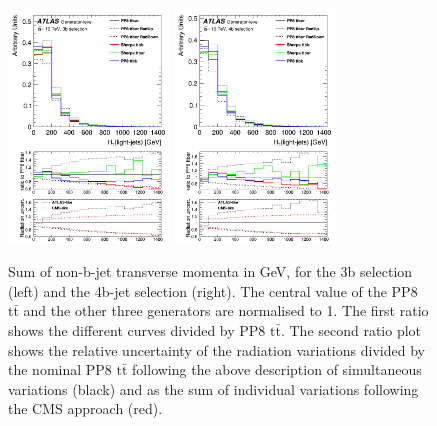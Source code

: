 \begin{figure}[!htb]
\centering
\includegraphics[width=0.38\textwidth]{Plots/ttbb/hisgenHTljets_4j3t__div}
\includegraphics[width=0.38\textwidth]{Plots/ttbb/hisgenHTljets_4j4t__div}
  \caption{Sum of non-b-jet transverse momenta in GeV, for the 3b selection (left) and the 4b-jet selection (right). The central value of the PP8 $\mathrm{t\bar{t}}$ and the other three generators are normalised to 1. The first ratio shows the different curves divided by PP8 $\mathrm{t\bar{t}}$. The second ratio plot shows the relative uncertainty of the radiation variations divided by the nominal PP8 $\mathrm{t\bar{t}}$ following the above description of simultaneous variations (black) and as the sum of individual variations following the CMS approach (red). \label{ttbb:HTljets}}
\end{figure}

